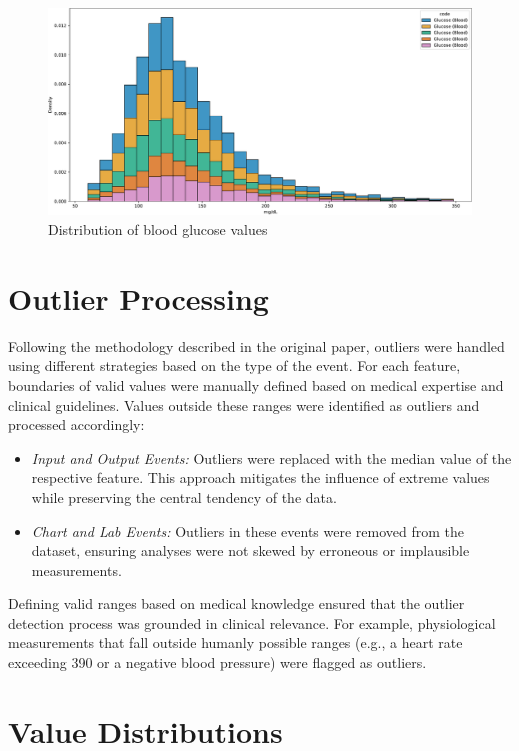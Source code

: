 \begin{figure}
    \centering
    \includegraphics[width=\textwidth]{./figures/hist_Glucose}
    \caption{Distribution of blood glucose values}
    \label{fig:hist_glucose_blood}
\end{figure}

\section{Outlier Processing}
\label{sec:outlier-processing}
Following the methodology described in the original paper, outliers were handled using different strategies based on the type of the event. For each feature, boundaries of valid values were manually defined based on medical expertise and clinical guidelines. Values outside these ranges were identified as outliers and processed accordingly:

\begin{itemize}
    \item \emph{Input and Output Events:} Outliers were replaced with the median value of the respective feature. This approach mitigates the influence of extreme values while preserving the central tendency of the data.
    \item \emph{Chart and Lab Events:} Outliers in these events were removed from the dataset, ensuring analyses were not skewed by erroneous or implausible measurements.
\end{itemize}

Defining valid ranges based on medical knowledge ensured that the outlier detection process was grounded in clinical relevance. For example, physiological measurements that fall outside humanly possible ranges (e.g., a heart rate exceeding \qty{390}{} or a negative blood pressure) were flagged as outliers.


\section{Value Distributions}


